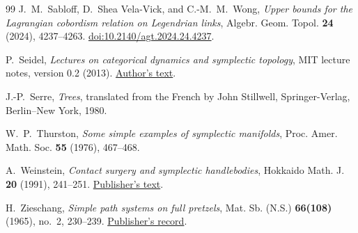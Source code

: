 \documentclass[11pt]{amsart}
\theoremstyle{definition}
\theoremstyle{remark}
\begin{document}
\begin{thebibliography}{99}
J.~M.~Sabloff, D.~Shea Vela-Vick, and C.-M.~M.~Wong,
\emph{Upper bounds for the Lagrangian cobordism relation on
Legendrian links}, Algebr. Geom. Topol. \textbf{24} (2024),
4237--4263. \href{https://doi.org/10.2140/agt.2024.24.4237}{doi:10.2140/agt.2024.24.4237}.

P.~Seidel, \emph{Lectures on categorical dynamics and symplectic
topology}, MIT lecture notes, version 0.2 (2013).
\href{https://math.mit.edu/~seidel/texts/937-lecture-notes.pdf}{Author's text}.

J.-P.~Serre, \emph{Trees}, translated from the French by John Stillwell,
Springer-Verlag, Berlin--New York, 1980.

W.~P.~Thurston, \emph{Some simple examples of symplectic manifolds},
Proc. Amer. Math. Soc. \textbf{55} (1976), 467--468.

A.~Weinstein, \emph{Contact surgery and symplectic handlebodies},
Hokkaido Math. J. \textbf{20} (1991), 241--251.
\href{https://www.math.sci.hokudai.ac.jp/hmj/page/20-2/pdf/HMJ_20_2_1991_241-251.pdf}{Publisher's text}.

H.~Zieschang, \emph{Simple path systems on full pretzels},
Mat. Sb. (N.S.) \textbf{66(108)} (1965), no.~2, 230--239.
\href{https://www.mathnet.ru/eng/sm4303}{Publisher's record}.

\end{thebibliography}
\end{document}
